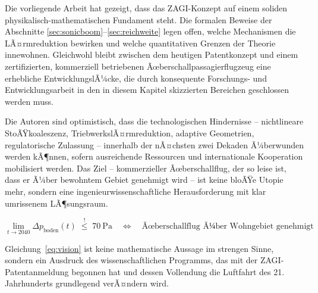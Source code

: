 ﻿\documentclass[12pt,a4paper]{article}
\theoremstyle{definition}
\theoremstyle{remark}
\begin{document}
Die vorliegende Arbeit hat gezeigt, dass das ZAGI-Konzept auf einem soliden
physikalisch-mathematischen Fundament steht. Die formalen Beweise der Abschnitte
\ref{sec:sonicboom}--\ref{sec:reichweite} legen offen, welche Mechanismen die
LÃ¤rmreduktion bewirken und welche quantitativen Grenzen der Theorie innewohnen.
Gleichwohl bleibt zwischen dem heutigen Patentkonzept und einem zertifizierten,
kommerziell betriebenen Ãœberschallpassagierflugzeug eine erhebliche EntwicklungslÃ¼cke,
die durch konsequente Forschungs- und Entwicklungsarbeit in den in diesem Kapitel
skizzierten Bereichen geschlossen werden muss.

Die Autoren sind optimistisch, dass die technologischen Hindernisse -- nichtlineare
StoÃŸkoaleszenz, TriebwerkslÃ¤rmreduktion, adaptive Geometrien, regulatorische Zulassung --
innerhalb der nÃ¤chsten zwei Dekaden Ã¼berwunden werden kÃ¶nnen, sofern ausreichende
Ressourcen und internationale Kooperation mobilisiert werden. Das Ziel -- kommerzieller
Ãœberschallflug, der so leise ist, dass er Ã¼ber bewohntem Gebiet genehmigt wird --
ist keine bloÃŸe Utopie mehr, sondern eine ingenieurwissenschaftliche Herausforderung
mit klar umrissenem LÃ¶sungsraum.

\begin{equation}
    \lim_{t \to 2040} \Delta p_\text{boden}(t) \;\overset{!}{\le}\; \SI{70}{\pascal}
    \quad \Leftrightarrow \quad
    \text{Ãœberschallflug Ã¼ber Wohngebiet genehmigt}
  \label{eq:vision}
\end{equation}

\noindent
Gleichung~\eqref{eq:vision} ist keine mathematische Aussage im strengen Sinne, sondern
ein Ausdruck des wissenschaftlichen Programms, das mit der ZAGI-Patentanmeldung begonnen
hat und dessen Vollendung die Luftfahrt des 21. Jahrhunderts grundlegend verÃ¤ndern wird.
\end{document}
